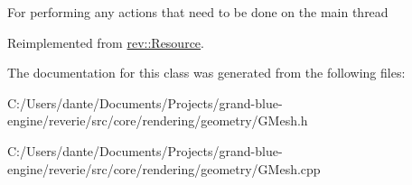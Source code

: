 For performing any actions that need to be done on the main thread 

Reimplemented from \mbox{\hyperlink{classrev_1_1_resource_a8a6daa71820d88c86bc6c0aa474d1af7}{rev\+::\+Resource}}.



The documentation for this class was generated from the following files\+:\begin{DoxyCompactItemize}
\item 
C\+:/\+Users/dante/\+Documents/\+Projects/grand-\/blue-\/engine/reverie/src/core/rendering/geometry/G\+Mesh.\+h\item 
C\+:/\+Users/dante/\+Documents/\+Projects/grand-\/blue-\/engine/reverie/src/core/rendering/geometry/G\+Mesh.\+cpp\end{DoxyCompactItemize}
